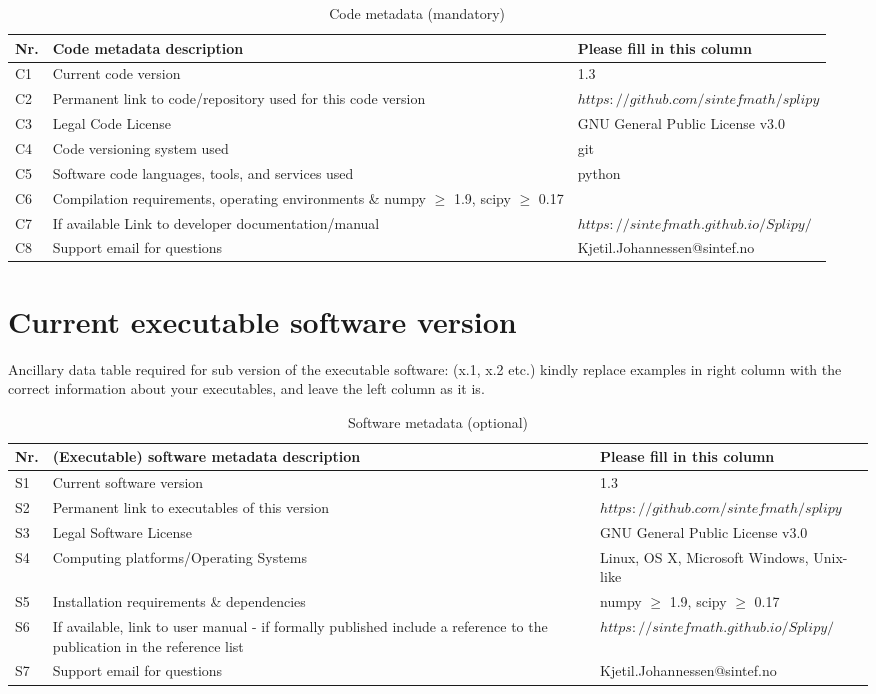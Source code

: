 \documentclass[preprint,12pt, a4paper]{elsarticle}
\begin{document}
\begin{table}[!h]
\begin{tabular}{|l|p{6.5cm}|p{6.5cm}|}
\hline
\textbf{Nr.} & \textbf{Code metadata description} & \textbf{Please fill in this column} \\
\hline
C1 & Current code version & 1.3 \\
\hline
C2 & Permanent link to code/repository used for this code version & $https://github.com/sintefmath/splipy$ \\
\hline
C3 & Legal Code License   & GNU General Public License v3.0  \\
\hline
C4 & Code versioning system used & git \\
\hline
C5 & Software code languages, tools, and services used & python \\
\hline
C6 & Compilation requirements, operating environments \& numpy $\geq$ 1.9, scipy $\geq$ 0.17 \\
\hline
C7 & If available Link to developer documentation/manual & $https://sintefmath.github.io/Splipy/$ \\
\hline
C8 & Support email for questions & Kjetil.Johannessen@sintef.no \\
\hline
\end{tabular}
\caption{Code metadata (mandatory)}
\label{} 
\end{table}

\section*{Current executable software version}
\label{}

Ancillary data table required for sub version of the executable software: (x.1, x.2 etc.) kindly replace examples in right column with the correct information about your executables, and leave the left column as it is.

\begin{table}[!h]
\begin{tabular}{|l|p{6.5cm}|p{6.5cm}|}
\hline
\textbf{Nr.} & \textbf{(Executable) software metadata description} & \textbf{Please fill in this column} \\
\hline
S1 & Current software version & 1.3 \\
\hline
S2 & Permanent link to executables of this version  & $https://github.com/sintefmath/splipy$ \\
\hline
S3 & Legal Software License & GNU General Public License v3.0 \\
\hline
S4 & Computing platforms/Operating Systems & Linux, OS X, Microsoft Windows, Unix-like \\
\hline
S5 & Installation requirements \& dependencies & numpy $\geq$ 1.9, scipy $\geq$ 0.17 \\
\hline
S6 & If available, link to user manual - if formally published include a reference to the publication in the reference list & $https://sintefmath.github.io/Splipy/$ \\
\hline
S7 & Support email for questions & Kjetil.Johannessen@sintef.no \\
\hline
\end{tabular}
\caption{Software metadata (optional)}
\label{} 
\end{table}
\end{document}
